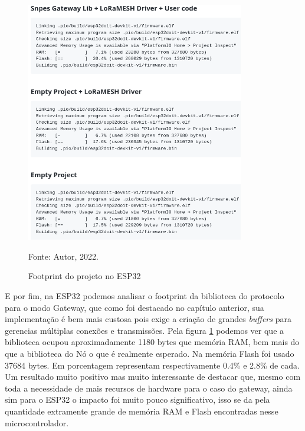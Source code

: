 \begin{figure}[H]
    \centering
	\caption{Footprint do projeto no ESP32}
    \includegraphics[width=0.85\textwidth,keepaspectratio]{img/foot-esp.png}
    \label{fig:foot-esp}
    
    Fonte: Autor, 2022.
\end{figure}

E por fim, na ESP32 podemos analisar o footprint da biblioteca do protocolo 
para o modo Gateway, que como foi destacado no capítulo anterior, sua implementação
é bem mais custosa pois exige a criação de grandes \textit{buffers} para gerencias
múltiplas conexões e transmissões. Pela figura \ref{fig:foot-esp} podemos ver que
a biblioteca ocupou aproximadamente 1180 bytes que memória RAM, bem mais do que
a biblioteca do Nó o que é realmente esperado. Na memória Flash foi usado 37684
bytes. Em porcentagem representam respectivamente 0.4\% e 2.8\% de cada.
Um resultado muito positivo mas muito interessante de destacar que, mesmo com toda
a necessidade de mais recursos de hardware para o caso do gateway, ainda sim para
o ESP32 o impacto foi muito pouco significativo, isso se da pela quantidade extramente
grande de memória RAM e Flash encontradas nesse microcontrolador.

\newpage